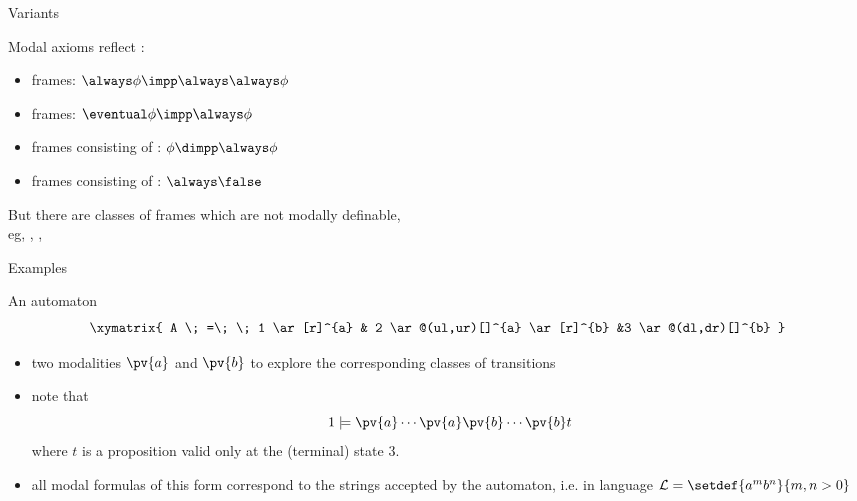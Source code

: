 \documentclass{beamer}
\begin{document}
\begin{slide}{Variants}\label{s:39}
\small

Modal axioms reflect :
\vspace{0.4cm}

\begin{itemize}
\item
{} frames: $\always \phi \impp \always \always \phi$
\item
{} frames: $\eventual \phi \impp \always  \phi$ 
\item frames consisting of : $ \phi \dimpp \always  \phi$ 
\item frames consisting of : $\always  \false$ 
\end{itemize}
\vspace{0.3cm}

But there are classes of frames which are not modally definable, \\
eg, , ,  
  
\end{slide}



\begin{slide}{Examples}\label{s:15}
\small
\begin{block}{An automaton}
\begin{equation*}
\xymatrix{
A \; =\; \; 1 \ar[r]^{a} & 2 \ar@(ul,ur)[]^{a}  \ar[r]^{b} &3  \ar@(dl,dr)[]^{b} 
}
\end{equation*}
\begin{itemize}
\item two modalities $\pv{a}$ and $\pv{b}$ to explore the corresponding classes of transitions
\item note that
$$ 1 \models \pv{a} \cdots \pv{a} \pv{b} \cdots \pv{b} t$$
where $t$ is a proposition valid only at the (terminal) state $3$. 
\item all modal formulas of this form correspond to the strings accepted by the automaton, i.e. in language ${\cal L} = \setdef{a^mb^n}{m,n > 0}$
\end{itemize}
\end{block}
\end{slide}
\end{document}
